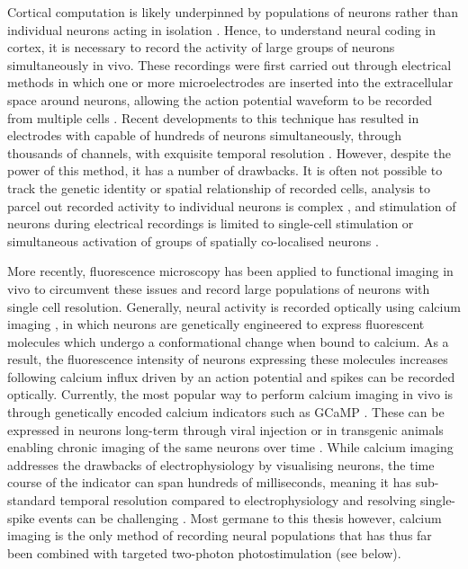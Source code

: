 Cortical computation is likely underpinned by populations of neurons  rather than individual neurons acting in isolation \cite{averbeck_neural_2006, kohn_correlations_2016, panzeri_cracking_2017}. Hence, to understand neural coding in cortex, it is necessary to record the activity of large groups of neurons simultaneously in vivo. These recordings were first carried out through electrical methods in which one or more microelectrodes are inserted into the extracellular space around neurons, allowing the action potential waveform to be recorded from multiple cells \cite{hubel_tungsten_1957, mcnaughton_stereotrode_1983, buzsaki_large-scale_2004}. Recent developments to this technique has resulted in electrodes with capable of hundreds of neurons simultaneously, through thousands of channels, with exquisite temporal resolution \cite{steinmetz_neuropixels_2021}. However, despite the power of this method, it has a number of drawbacks. It is often not possible to track the genetic identity or spatial relationship of recorded cells, analysis to parcel out recorded activity to individual neurons is complex \cite{harris_improving_2016}, and stimulation of neurons during electrical recordings is limited to single-cell stimulation \cite{margrie_vivo_2002, houweling_nanostimulation_2010} or simultaneous activation of groups of spatially co-localised neurons \cite{penfield_w_somatic_1937, asanuma_functional_1967, salzman_cortical_1990, romo_somatosensory_1998, cardin_driving_2009, kim_integration_2017}.

More recently, fluorescence microscopy has been applied to functional imaging in vivo to circumvent these issues and record large populations of neurons with single cell resolution. Generally, neural activity is recorded optically using calcium imaging \cite{grienberger_imaging_2012}, in which neurons are genetically engineered to express fluorescent molecules which undergo a conformational change when bound to calcium. As a result, the fluorescence intensity of neurons expressing these molecules increases following calcium influx driven by an action potential \cite{berridge_neuronal_1998} and spikes can be recorded optically. Currently, the most popular way to perform calcium imaging in vivo is through genetically encoded calcium indicators \cite{looger_genetically_2012} such as GCaMP \cite{chen_ultrasensitive_2013, dana_high-performance_2019}. These can be expressed in neurons long-term through viral injection \cite{packer_simultaneous_2015} or in transgenic animals \cite{huang_relationship_2021} enabling chronic imaging of the same neurons over time \cite{andermann_chronic_2013}. While calcium imaging addresses the drawbacks of electrophysiology by visualising neurons, the time course of the indicator can span hundreds of milliseconds, meaning it has sub-standard temporal resolution compared to electrophysiology and resolving single-spike events can be challenging \cite{huang_relationship_2021}. Most germane to this thesis however, calcium imaging is the only method of recording neural populations that has thus far been combined with targeted two-photon photostimulation \cite{packer_simultaneous_2015} (see below).

